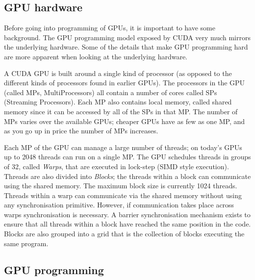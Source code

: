 \documentclass[a4paper]{book}
\begin{document}

\subsection{GPU hardware} 

Before going into programming of GPUs, it is important to have some background. The 
GPU programming model exposed by CUDA very much mirrors the underlying hardware. Some 
of the details that make GPU programming hard are more apparent when looking at the 
underlying hardware. 

A CUDA GPU is built around a single kind of processor (as opposed to the different 
kinds of processors found in earlier GPUs). The processors in the GPU (called MPs, 
MultiProcessors) all contain a number of cores called SPs (Streaming Processors). 
Each MP also contains local memory, called shared memory since it can be accessed 
by all of the SPs in that MP. The number of MPs varies over the available GPUs; cheaper 
GPUs have as few as one MP, and as you go up in price the number of MPs increases.

Each MP of the GPU can manage a large number of threads; on today's GPUs up to 
2048 threads can run on a single MP. The GPU schedules threads in groups of 32, called 
{\em Warps}, that are executed in lock-step (SIMD style execution). Threads are 
also divided into {\em Blocks}; the threads within a block can communicate using the 
shared memory. The maximum block size is currently 1024 threads. Threads within 
a warp can communicate via the shared memory without using any synchronisation 
primitive. However, if communication takes place across warps synchronisation is 
necessary. A barrier synchronisation mechanism exists to ensure that all threads within a block 
have reached the same position in the code. Blocks are also grouped into a grid that 
is the collection of blocks executing the same program. 


\subsection{GPU programming} 
\label{sec:GPUPROGRAMMING}
\end{document}
